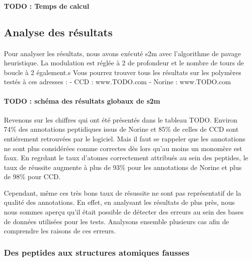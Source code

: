 \documentclass[12pt,french,twoside]{report}
\begin{document}
\paragraph{TODO : Temps de calcul}



\subsection{Analyse des résultats}

\paragraph{}Pour analyser les résultats, nous avons exécuté s2m avec l'algorithme de pavage heuristique.
La modulation est réglée à 2 de profondeur et le nombre de tours de boucle à 2 également.s
Vous pourrez trouver tous les résultats sur les polymères testés à ces adresses :
- CCD : www.TODO.com
- Norine : www.TODO.com

\paragraph{TODO : schéma des résultats globaux de s2m}

\paragraph{}Revenons sur les chiffres qui ont été présentés dans le tableau TODO.
Environ 74\% des annotations peptidiques issus de Norine et 85\% de celles de CCD sont entiérement retrouvées par le logiciel.
Mais il faut se rappeler que les annotations ne sont plus considérées comme correctes dès lors qu'au moins un monomère est faux.
En regrdant le taux d'atomes correctement attribués au sein des peptides, le taux de réussite augmente à plus de 93\% pour les annotations de Norine et plus de 98\% pour CCD.

Cependant, même ces très bons taux de résussite ne sont pas représentatif de la qualité des annotations.
En effet, en analysant les résultats de plus près, nous nous sommes aperçu qu'il était possible de détecter des erreurs au sein des bases de données utilisées pour les tests.
Analysons ensemble plusieurs cas afin de comprendre les raisons de ces erreurs.


\subsubsection{Des peptides aux structures atomiques fausses}
\end{document}
